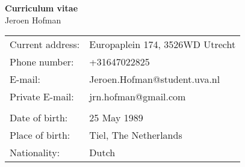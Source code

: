 \documentclass[11pt,a4paper,onecolumn]{article}
\begin{document}
{\huge\textbf{Curriculum vitae}}\\

{\Large Jeroen Hofman }\\

\begin{table}[H]
  \begin{tabular}{p{} p{}}

    Current address: & Europaplein 174, 3526WD Utrecht\\
    Phone number: & +31647022825\\
    E-mail: & Jeroen.Hofman@student.uva.nl\\
    Private E-mail: & jrn.hofman@gmail.com\\
    \\
    Date of birth: & 25 May 1989\\
    Place of birth: & Tiel, The Netherlands\\
    Nationality: & Dutch\\

  \end{tabular}
\end{table}
\end{document}
